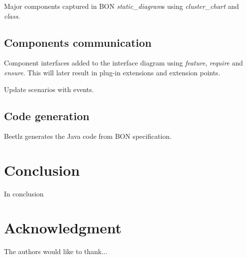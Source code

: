 \documentclass[conference]{IEEEtran}
\begin{document}
Major components captured in BON \emph{static\_diagram}s using
\emph{cluster\_chart} and \emph{class}.

%
\subsection{Components communication}
\label{sec:comp-comm}

Component interfaces added to the interface diagram using
\emph{feature}, \emph{require} and \emph{ensure}. This will later
result in plug-in extensions and extension points.

Update scenarios with events.

%
\subsection{Code generation}
\label{sec:code-generation}

Beetlz generates the Java code from BON specification.

\section{Conclusion}
\label{sec:conclusion}

In conclusion


\section*{Acknowledgment}
\label{sec:acknowledgment}

The authors would like to thank...



%
%
%
%

\end{document}
